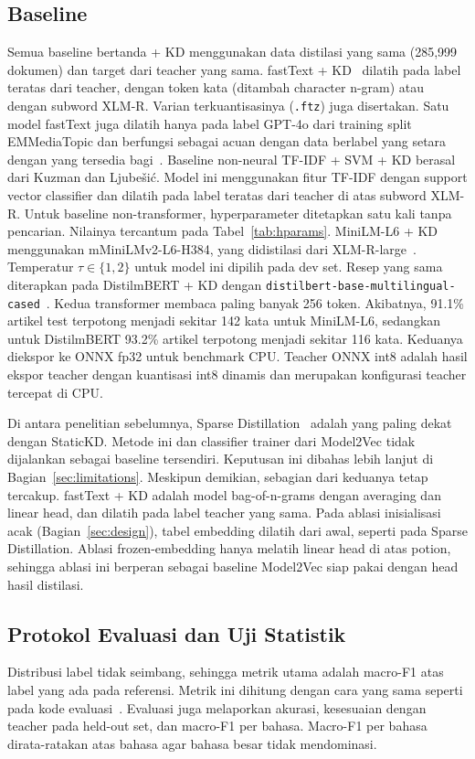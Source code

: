 \documentclass[journal]{IEEEtran}
\begin{document}
\subsection{Baseline}
\label{sec:baselines}
Semua baseline bertanda + KD menggunakan data distilasi yang sama (285,999 dokumen) dan target dari teacher yang sama. fastText + KD~\cite{joulin2017bag} dilatih pada label teratas dari teacher, dengan token kata (ditambah character n-gram) atau dengan subword XLM-R. Varian terkuantisasinya (\texttt{.ftz}) juga disertakan. Satu model fastText juga dilatih hanya pada label GPT-4o dari training split EMMediaTopic dan berfungsi sebagai acuan dengan data berlabel yang setara dengan yang tersedia bagi~\cite{kuzman2025llm}. Baseline non-neural TF-IDF + SVM + KD berasal dari Kuzman dan Ljube\v{s}i\'c. Model ini menggunakan fitur TF-IDF dengan support vector classifier dan dilatih pada label teratas dari teacher di atas subword XLM-R. Untuk baseline non-transformer, hyperparameter ditetapkan satu kali tanpa pencarian. Nilainya tercantum pada Tabel~\ref{tab:hparams}. MiniLM-L6 + KD menggunakan mMiniLMv2-L6-H384, yang didistilasi dari XLM-R-large~\cite{wang2021minilmv2}. Temperatur $\tau\in\{1,2\}$ untuk model ini dipilih pada dev set. Resep yang sama diterapkan pada DistilmBERT + KD dengan \texttt{distilbert-base-multilingual-cased}~\cite{sanh2019distilbert}. Kedua transformer membaca paling banyak 256 token. Akibatnya, 91.1\% artikel test terpotong menjadi sekitar 142 kata untuk MiniLM-L6, sedangkan untuk DistilmBERT 93.2\% artikel terpotong menjadi sekitar 116 kata. Keduanya diekspor ke ONNX fp32 untuk benchmark CPU. Teacher ONNX int8 adalah hasil ekspor teacher dengan kuantisasi int8 dinamis dan merupakan konfigurasi teacher tercepat di CPU.

Di antara penelitian sebelumnya, Sparse Distillation~\cite{ye2022sparse} adalah yang paling dekat dengan StaticKD. Metode ini dan classifier trainer dari Model2Vec tidak dijalankan sebagai baseline tersendiri. Keputusan ini dibahas lebih lanjut di Bagian~\ref{sec:limitations}. Meskipun demikian, sebagian dari keduanya tetap tercakup. fastText + KD adalah model bag-of-n-grams dengan averaging dan linear head, dan dilatih pada label teacher yang sama. Pada ablasi inisialisasi acak (Bagian~\ref{sec:design}), tabel embedding dilatih dari awal, seperti pada Sparse Distillation. Ablasi frozen-embedding hanya melatih linear head di atas potion, sehingga ablasi ini berperan sebagai baseline Model2Vec siap pakai dengan head hasil distilasi.

\subsection{Protokol Evaluasi dan Uji Statistik}
\label{sec:protocol}
Distribusi label tidak seimbang, sehingga metrik utama adalah macro-F1 atas label yang ada pada referensi. Metrik ini dihitung dengan cara yang sama seperti pada kode evaluasi~\cite{kuzman2025llm}. Evaluasi juga melaporkan akurasi, kesesuaian dengan teacher pada held-out set, dan macro-F1 per bahasa. Macro-F1 per bahasa dirata-ratakan atas bahasa agar bahasa besar tidak mendominasi.
\end{document}
